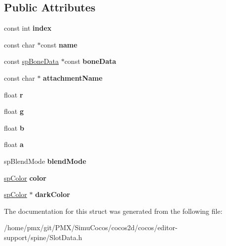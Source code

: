 \subsection*{Public Attributes}
\begin{DoxyCompactItemize}
\item 
\mbox{\label{structspSlotData_aaa9b7bc9b171b66149f960a9bea91569}} 
const int {\bfseries index}
\item 
\mbox{\label{structspSlotData_a3a8699ea42e63fec5f16cedf6ab5f239}} 
const char $\ast$const {\bfseries name}
\item 
\mbox{\label{structspSlotData_a10cf3f1c508f998850fc618514b08f5e}} 
const \hyperlink{structspBoneData}{sp\+Bone\+Data} $\ast$const {\bfseries bone\+Data}
\item 
\mbox{\label{structspSlotData_a9a133925c478f5badabd2189c43bd2fa}} 
const char $\ast$ {\bfseries attachment\+Name}
\item 
\mbox{\label{structspSlotData_a6e265beafc5785362574b218a0ea3e73}} 
float {\bfseries r}
\item 
\mbox{\label{structspSlotData_a3b83f65c5cbfb352b478667771ea7700}} 
float {\bfseries g}
\item 
\mbox{\label{structspSlotData_ac459f5f5c180873980e2d3b1b36dde51}} 
float {\bfseries b}
\item 
\mbox{\label{structspSlotData_a9c759e64d6c36cccbd0ace8273a4cc10}} 
float {\bfseries a}
\item 
\mbox{\label{structspSlotData_a3609be7f067b78e70a6e066139973a05}} 
sp\+Blend\+Mode {\bfseries blend\+Mode}
\item 
\mbox{\label{structspSlotData_aa732d88ddc9b063660e2122b38811e23}} 
\hyperlink{structspColor}{sp\+Color} {\bfseries color}
\item 
\mbox{\label{structspSlotData_a924dcd119abae3a482c001d4ff2370fe}} 
\hyperlink{structspColor}{sp\+Color} $\ast$ {\bfseries dark\+Color}
\end{DoxyCompactItemize}


The documentation for this struct was generated from the following file\+:\begin{DoxyCompactItemize}
\item 
/home/pmx/git/\+P\+M\+X/\+Simu\+Cocos/cocos2d/cocos/editor-\/support/spine/Slot\+Data.\+h\end{DoxyCompactItemize}
